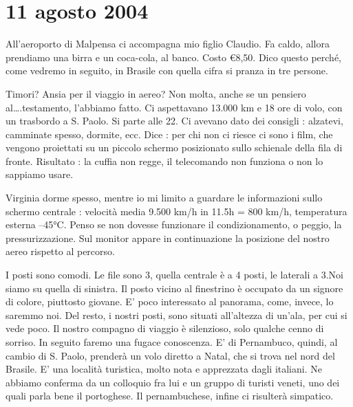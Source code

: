 \documentclass[a4paper,10pt]{book}
\begin{document}
\section*{11 agosto 2004}

All’aeroporto di Malpensa ci accompagna mio figlio Claudio. Fa caldo, allora prendiamo una birra e un coca-cola, al banco. Costo \euro 8,50. Dico questo perché, come vedremo in seguito, in Brasile con quella cifra si pranza in tre persone.

Timori? Ansia per il viaggio in aereo? Non molta, anche se un pensiero al….testamento, l’abbiamo fatto.
Ci aspettavano 13.000 km e 18 ore di volo, con un trasbordo a S. Paolo.
Si parte alle 22. Ci avevano dato dei consigli : alzatevi, camminate spesso, dormite, ecc. Dice : per chi non ci riesce ci sono i film,  che vengono proiettati su un piccolo schermo posizionato sullo schienale della fila di fronte. Risultato : la cuffia non regge, il telecomando non funziona o non lo sappiamo usare.

Virginia dorme spesso, mentre io mi limito a guardare le informazioni sullo schermo centrale : velocità media 9.500 km/h in 11.5h = 800 km/h, temperatura esterna –45°C. Penso se non dovesse funzionare il condizionamento, o peggio, la pressurizzazione. Sul monitor appare in continuazione la posizione del nostro aereo rispetto al percorso.

I posti sono comodi. Le file sono 3, quella centrale è a 4 posti, le laterali a 3.Noi siamo su quella di sinistra. Il posto vicino al finestrino è occupato da un signore di colore, piuttosto giovane. E’ poco interessato al panorama, come, invece, lo saremmo noi. Del resto, i nostri posti, sono situati all’altezza di un’ala, per cui si vede poco. Il nostro compagno di viaggio è silenzioso, solo qualche cenno di sorriso. In seguito faremo una fugace conoscenza. E’ di Pernambuco, quindi, al cambio di S. Paolo, prenderà un volo diretto a Natal, che si trova nel nord del Brasile. E’ una località turistica, molto nota e apprezzata dagli italiani. Ne abbiamo conferma da un colloquio fra lui e un gruppo di turisti veneti, uno dei quali parla bene il portoghese. Il pernambuchese, infine ci risulterà simpatico.
\end{document}
